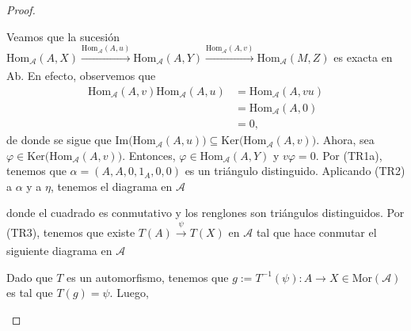 \documentclass[tesis]{subfiles}
\begin{document}
\begin{proof}
\begin{enumerate}[label=(\alph*)]
    Veamos que la sucesión $\text{Hom}_\mathscr{A}(A,X)\xrightarrow[]{\text{Hom}_\mathscr{A}(A,u)} \text{Hom}_\mathscr{A}(A,Y)\xrightarrow[]{\text{Hom}_\mathscr{A}(A,v)} \text{Hom}_\mathscr{A}(M,Z)$ es exacta en Ab. En efecto, observemos que
    \begin{align*}
        \text{Hom}_\mathscr{A}(A,v)\text{Hom}_\mathscr{A}(A,u) &= \text{Hom}_\mathscr{A}(A,vu) \\
                                                               &= \text{Hom}_\mathscr{A}(A,0) \tag{por el inciso (a)} \\
                                                               &= 0,
    \end{align*}
    de donde se sigue que $\text{Im}\big( \text{Hom}_\mathscr{A}(A,u) \big) \subseteq\text{Ker}\big( \text{Hom}_\mathscr{A}(A,v) \big)$. Ahora, sea $\varphi\in\text{Ker}\big(\text{Hom}_\mathscr{A}(A,v)\big)$. Entonces, $\varphi\in\text{Hom}_\mathscr{A}(A,Y)$ y $v \varphi = 0$. Por (TR1a), tenemos que $\alpha=(A,A,0,1_A,0,0)$ es un triángulo distinguido. Aplicando (TR2) a $\alpha$ y a $\eta$, tenemos el diagrama en $\mathscr{A}$
    \begin{center}
    \end{center}
    donde el cuadrado es conmutativo y los renglones son triángulos distinguidos. Por (TR3), tenemos que existe $T(A)\xrightarrow[]{\psi}T(X)$ en $\mathscr{A}$ tal que hace conmutar el siguiente diagrama en $\mathscr{A}$
    \begin{center}
    \end{center}
    Dado que $T$ es un automorfismo, tenemos que $g:=T^{-1}(\psi):A\to X\in\text{Mor}(\mathscr{A})$ es tal que $T(g)=\psi$. Luego,

\end{enumerate}
\end{proof}
\end{document}
